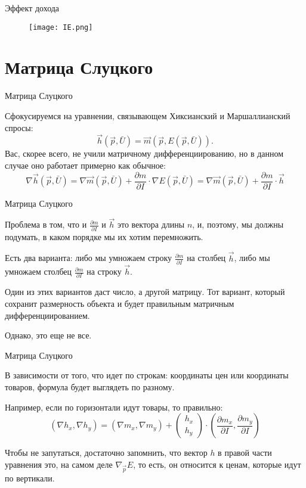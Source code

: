 \documentclass{beamer}
\begin{document}
\begin{frame}{Эффект дохода}

\begin{figure}[hbt]
\centering
\texttt{[image: IE.png]}
\end{figure}

\end{frame}

\section{Матрица Слуцкого}

\begin{frame}{Матрица Слуцкого}

Сфокусируемся на уравнении, связывающем Хиксианский и Маршаллианский спросы:
$$\vec h (\vec p, \bar U) = \vec m(\vec p,  E(\vec p, \bar U)).$$
Вас, скорее всего, не учили матричному дифференциированию, но в данном случае оно работает примерно как обычное:
$$ \nabla \vec h(\vec p,  \bar U) = \nabla \vec m(\vec p,  \bar U) + \frac{\partial m}{\partial I} \cdot \nabla E(\vec p, \bar U) = \nabla \vec m(\vec p,  \bar U) + \frac{\partial m}{\partial I} \cdot \vec h $$

\end{frame}

\begin{frame}{Матрица Слуцкого}

Проблема в том, что и $\frac{\partial m}{\partial I}$ и $\vec h$ это вектора длины $n$, и, поэтому, мы должны подумать, в каком порядке мы их хотим перемножить. 

Есть два варианта: либо мы умножаем строку $\frac{\partial m}{\partial I}$ на столбец $\vec h$, либо мы умножаем столбец $\frac{\partial m}{\partial I}$ на строку $\vec h$. 

Один из этих вариантов даст число, а другой матрицу. Тот вариант, который сохранит размерность объекта и будет правильным матричным дифференциированием. 

Однако, это еще не все. 

\end{frame}

\begin{frame}{Матрица Слуцкого}

В зависимости от того, что идет по строкам: координаты цен или координаты товаров, формула будет выглядеть по разному. 

Например, если по горизонтали идут товары, то правильно:
$$ 
(\nabla h_x, \nabla h_y) = (\nabla m_x, \nabla m_y) + 
\begin{pmatrix} 
h_x \\
h_y
\end{pmatrix} 
\cdot (\frac{\partial m_x}{\partial I}, \frac{\partial m_y}{\partial I})
$$

Чтобы не запутаться, достаточно запомнить, что вектор $h$ в правой части уравнения это, на самом деле $\nabla_{\vec p} E$, то есть, он относится к ценам, которые идут по вертикали.

\end{frame}
\end{document}
